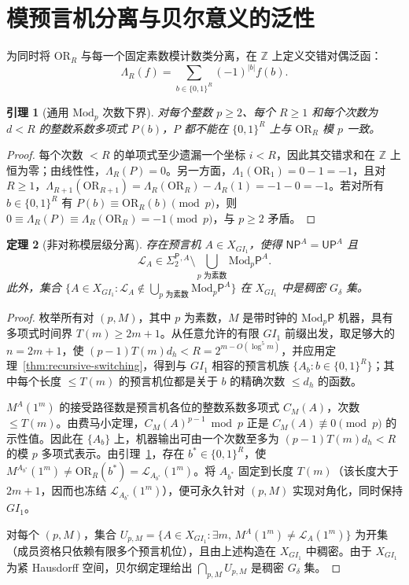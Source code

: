 \documentclass[11pt,a4paper]{article}
\newtheorem{theorem}{定理}[section]
\newtheorem{lemma}[theorem]{引理}
\theoremstyle{definition}
\theoremstyle{remark}
\newcommand{\NP}{\mathsf{NP}}
\newcommand{\UP}{\mathsf{UP}}
\newcommand{\Modp}{\mathrm{Mod}_p\mathsf{P}}
\newcommand{\SigTwo}{\Sigma_2^{\mathsf{P}}}
\newcommand{\OR}{\mathrm{OR}}
\newcommand{\Z}{\mathbb{Z}}
\newcommand{\GI}{GI_1}
\begin{document}
\section{模预言机分离与贝尔意义的泛性}

为同时将 $\OR_R$ 与每一个固定素数模计数类分离，在 $\Z$ 上定义交错对偶泛函：
\[
  \Lambda_R(f) = \sum_{b \in \{0,1\}^R} (-1)^{|b|} f(b).
\]

\begin{lemma}[通用 $\mathrm{Mod}_p$ 次数下界]
\label{lem:modp-lb}
对每个整数 $p\ge2$、每个 $R\ge1$ 和每个次数为 $d<R$ 的整数系数多项式 $P(b)$，$P$ 都不能在 $\{0,1\}^R$ 上与 $\OR_R$ 模 $p$ 一致。
\end{lemma}

\begin{proof}
每个次数 $<R$ 的单项式至少遗漏一个坐标 $i<R$，因此其交错求和在 $\Z$ 上恒为零；由线性性，$\Lambda_R(P)=0$。另一方面，$\Lambda_1(\OR_1)=0-1=-1$，且对 $R\ge1$，$\Lambda_{R+1}(\OR_{R+1})=\Lambda_R(\OR_R)-\Lambda_R(1)=-1-0=-1$。若对所有 $b\in\{0,1\}^R$ 有 $P(b)\equiv\OR_R(b)\pmod p$，则 $0\equiv\Lambda_R(P)\equiv\Lambda_R(\OR_R)=-1\pmod p$，与 $p\ge2$ 矛盾。
\end{proof}

\begin{theorem}[非对称模层级分离]
\label{thm:main-sep}
存在预言机 $A\in X_{\GI}$，使得 $\NP^A=\UP^A$ 且
\[
  \mathcal{L}_A \in \SigTwo{}^{,A} \setminus \bigcup_{p\text{ 为素数}} \Modp^A.
\]
此外，集合 $\{A\in X_{\GI}:\mathcal L_A\notin\bigcup_{p\text{ 为素数}}\Modp^A\}$ 在 $X_{\GI}$ 中是稠密 $G_\delta$ 集。
\end{theorem}

\begin{proof}
枚举所有对 $(p,M)$，其中 $p$ 为素数，$M$ 是带时钟的 $\Modp$ 机器，具有多项式时间界 $T(m)\ge2m+1$。从任意允许的有限 $\GI$ 前缀出发，取足够大的 $n=2m+1$，使 $(p-1)T(m)d_h<R=2^{m-O(\log^5 m)}$，并应用定理~\ref{thm:recursive-switching}，得到与 $\GI$ 相容的预言机族 $\{A_b:b\in\{0,1\}^R\}$；其中每个长度 $\le T(m)$ 的预言机位都是关于 $b$ 的精确次数 $\le d_h$ 的函数。

$M^A(1^m)$ 的接受路径数是预言机各位的整数系数多项式 $C_M(A)$，次数 $\le T(m)$。由费马小定理，$C_M(A)^{p-1}\bmod p$ 正是 $C_M(A)\not\equiv0\pmod p$ 的示性值。因此在 $\{A_b\}$ 上，机器输出可由一个次数至多为 $(p-1)T(m)d_h<R$ 的模 $p$ 多项式表示。由引理~\ref{lem:modp-lb}，存在 $b^*\in\{0,1\}^R$，使 $M^{A_{b^*}}(1^m)\ne\OR_R(b^*)=\mathcal L_{A_{b^*}}(1^m)$。将 $A_{b^*}$ 固定到长度 $T(m)$（该长度大于 $2m+1$，因而也冻结 $\mathcal L_{A_{b^*}}(1^m)$），便可永久针对 $(p,M)$ 实现对角化，同时保持 $\GI$。

对每个 $(p,M)$，集合 $U_{p,M}=\{A\in X_{\GI}:\exists m,\,M^A(1^m)\ne\mathcal L_A(1^m)\}$ 为开集（成员资格只依赖有限多个预言机位），且由上述构造在 $X_{\GI}$ 中稠密。由于 $X_{\GI}$ 为紧 Hausdorff 空间，贝尔纲定理给出 $\bigcap_{p,M}U_{p,M}$ 是稠密 $G_\delta$ 集。
\end{proof}
\end{document}
